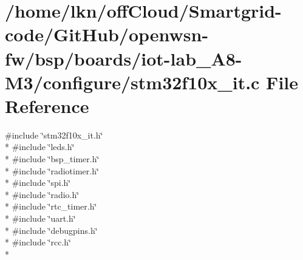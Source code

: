 \hypertarget{iot-lab___a8-_m3_2configure_2stm32f10x__it_8c}{}\section{/home/lkn/off\+Cloud/\+Smartgrid-\/code/\+Git\+Hub/openwsn-\/fw/bsp/boards/iot-\/lab\+\_\+\+A8-\/\+M3/configure/stm32f10x\+\_\+it.c File Reference}
\label{iot-lab___a8-_m3_2configure_2stm32f10x__it_8c}
{\ttfamily \#include \char`\"{}stm32f10x\+\_\+it.\+h\char`\"{}}\\*
{\ttfamily \#include \char`\"{}leds.\+h\char`\"{}}\\*
{\ttfamily \#include \char`\"{}bsp\+\_\+timer.\+h\char`\"{}}\\*
{\ttfamily \#include \char`\"{}radiotimer.\+h\char`\"{}}\\*
{\ttfamily \#include \char`\"{}spi.\+h\char`\"{}}\\*
{\ttfamily \#include \char`\"{}radio.\+h\char`\"{}}\\*
{\ttfamily \#include \char`\"{}rtc\+\_\+timer.\+h\char`\"{}}\\*
{\ttfamily \#include \char`\"{}uart.\+h\char`\"{}}\\*
{\ttfamily \#include \char`\"{}debugpins.\+h\char`\"{}}\\*
{\ttfamily \#include \char`\"{}rcc.\+h\char`\"{}}\\*
